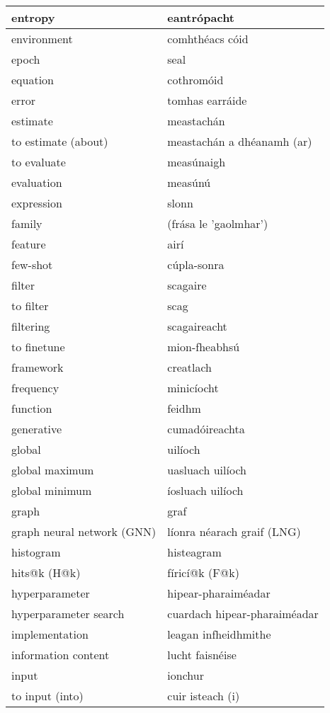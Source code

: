 \begin{longtable}{|l|l|}
		entropy&eantrópacht\\ \hline 
		environment&comhthéacs cóid\\ \hline 
		epoch&seal\\ \hline 
		equation&cothromóid\\ \hline 
		error&tomhas earráide\\ \hline 
		estimate&meastachán\\ \hline 
		to estimate (about)&meastachán a dhéanamh (ar)\\ \hline 
		to evaluate&measúnaigh\\ \hline 
		evaluation&measúnú\\ \hline 
		expression&slonn\\ \hline 
		family&(frása le 'gaolmhar')\\ \hline 
		feature&airí\\ \hline 
		few-shot&cúpla-sonra\\ \hline 
		filter&scagaire\\ \hline 
		to filter&scag\\ \hline 
		filtering&scagaireacht\\ \hline 
		to finetune&mion-fheabhsú\\ \hline 
		framework&creatlach\\ \hline 
		frequency&minicíocht\\ \hline 
		function&feidhm\\ \hline 
		generative&cumadóireachta\\ \hline 
		global&uilíoch\\ \hline 
		global maximum&uasluach uilíoch\\ \hline 
		global minimum&íosluach uilíoch\\ \hline 
		graph&graf\\ \hline 
		graph neural network (GNN)&líonra néarach graif (LNG)\\ \hline 
		histogram&histeagram\\ \hline 
		hits@k (H@k)&fíricí@k (F@k)\\ \hline 
		hyperparameter&hipear-pharaiméadar\\ \hline 
		hyperparameter search&cuardach hipear-pharaiméadar\\ \hline 
		implementation&leagan infheidhmithe\\ \hline 
		information content&lucht faisnéise\\ \hline 
		input&ionchur\\ \hline 
		to input (into)&cuir isteach (i)\\ \hline 

\end{longtable}
